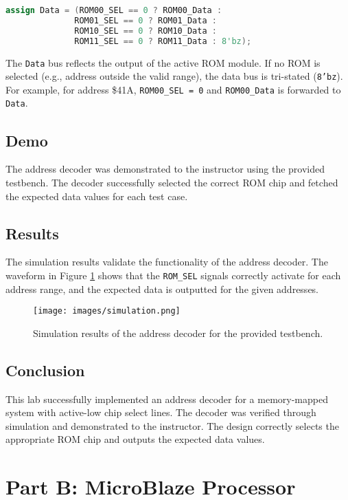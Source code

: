 \begin{lstlisting}[language=Verilog, caption={Data Output Multiplexing}]
assign Data = (ROM00_SEL == 0 ? ROM00_Data :
              ROM01_SEL == 0 ? ROM01_Data :
              ROM10_SEL == 0 ? ROM10_Data :
              ROM11_SEL == 0 ? ROM11_Data : 8'bz);
\end{lstlisting}

The \texttt{Data} bus reflects the output of the active ROM module. If no ROM is selected (e.g., address outside the valid range), the data bus is tri-stated (\texttt{8'bz}). For example, for address \$41A, \texttt{ROM00\_SEL = 0} and \texttt{ROM00\_Data} is forwarded to \texttt{Data}.

\subsection{Demo}
The address decoder was demonstrated to the instructor using the provided testbench. The decoder successfully selected the correct ROM chip and fetched the expected data values for each test case.

\subsection{Results}
The simulation results validate the functionality of the address decoder. The waveform in Figure \ref{fig:simulation} shows that the \texttt{ROM\_SEL} signals correctly activate for each address range, and the expected data is outputted for the given addresses.

\begin{figure}[H]
    \centering
    \texttt{[image: images/simulation.png]}
    \caption{Simulation results of the address decoder for the provided testbench.}
    \label{fig:simulation}
\end{figure}

\subsection{Conclusion}
This lab successfully implemented an address decoder for a memory-mapped system with active-low chip select lines. The decoder was verified through simulation and demonstrated to the instructor. The design correctly selects the appropriate ROM chip and outputs the expected data values.

\newpage
\section{Part B: MicroBlaze Processor}

